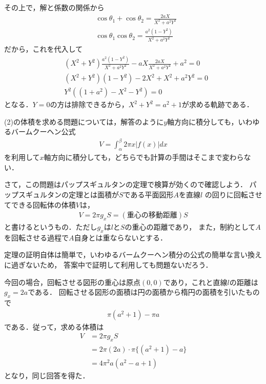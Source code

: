 \documentclass[a4paper,10pt]{ltjsarticle}
\begin{document}
\begin{multicols}{2}
その上で，解と係数の関係から
\begin{align}
  &\cos\theta_1 + \cos\theta_2 = \frac{2aX}{X^2+a^2Y^2} \\
  &\cos\theta_1\cos\theta_2    = \frac{a^2\left(1-Y^2\right)}{X^2+a^2Y^2} 
\end{align}
だから，これを代入して
\begin{align*}
  &\left(X^2+Y^2\right)\frac{a^2\left(1-Y^2\right)}{X^2+a^2Y^2} -aX\frac{2aX}{X^2+a^2Y^2} + a^2 = 0 \\
  &\left(X^2+Y^2\right)\left(1-Y^2\right) -2X^2 + X^2+a^2Y^2 = 0 \\
  &Y^2\left((1+a^2) - X^2-Y^2\right) = 0 
\end{align*}
となる．$Y=0$の方は排除できるから，$X^2+Y^2=a^2+1$が求める軌跡である．


\vspace{10pt}
(2)の体積を求める問題については，解答のように$y$軸方向に積分しても，いわゆるバームクーヘン公式
\begin{align*}
  V = \int_{\alpha}^{\beta} 2\pi x |f(x)| dx
\end{align*}
を利用して$x$軸方向に積分しても，どちらでも計算の手間はそこまで変わらない．

さて，この問題はパップスギュルタンの定理で検算が効くので確認しよう．
パップスギュルタンの定理とは面積が$S$である平面図形$A$を直線$l$ の回りに回転させてできる回転体の体積$V$は，
\begin{align*}
  V=2\pi g_x S = (\text{重心の移動距離}) S
\end{align*}
と書けるというもの．ただし$g_x$は$l$と$S$の重心の距離であり，
また，制約として$A$を回転させる過程で$A$自身とは重ならないとする．

定理の証明自体は簡単で，いわゆるバームクーヘン積分の公式の簡単な言い換えに過ぎないため，
答案中で証明して利用しても問題ないだろう．

今回の場合，回転させる図形の重心は原点$(0,0)$であり，これと直線$l$の距離は$g_x =2a$である．
回転させる図形の面積は円の面積から楕円の面積を引いたもので
\begin{align*}
  \pi(a^2+1) - \pi a
\end{align*}
である．従って，求める体積は
\begin{align*}
    V 
    &= 2\pi g_x S \\
    &= 2\pi (2a) \cdot \pi \{(a^2+1)-a\} \\
    &= 4\pi^2 a(a^2-a+1) 
\end{align*}
となり，同じ回答を得た．

\newpage
\end{multicols}
\end{document}
